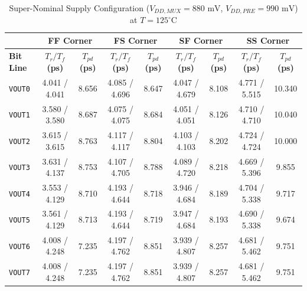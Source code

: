 \begin{table}[H]
    \centering
    \renewcommand{\arraystretch}{1.3}
    \setlength{\tabcolsep}{4pt}
    \small
    \begin{tabular}{|l|cc|cc|cc|cc|}
        \hline
        & \multicolumn{2}{c|}{\textbf{FF Corner}} & \multicolumn{2}{c|}{\textbf{FS Corner}} & \multicolumn{2}{c|}{\textbf{SF Corner}} & \multicolumn{2}{c|}{\textbf{SS Corner}} \\ \hline
        \textbf{Bit Line} & \textbf{$T_r / T_f$ (ps)} & \textbf{$T_{pd}$ (ps)} & \textbf{$T_r / T_f$ (ps)} & \textbf{$T_{pd}$ (ps)} & \textbf{$T_r / T_f$ (ps)} & \textbf{$T_{pd}$ (ps)} & \textbf{$T_r / T_f$ (ps)} & \textbf{$T_{pd}$ (ps)} \\ \hline
        \texttt{VOUT0} & 4.041 / 4.041 & 8.656 & 4.085 / 4.696 & 8.647 & 4.047 / 4.679 & 8.108 & 4.771 / 5.515 & 10.340 \\ 
        \texttt{VOUT1} & 3.580 / 3.580 & 8.687 & 4.075 / 4.075 & 8.684 & 4.051 / 4.051 & 8.126 & 4.710 / 4.710 & 10.040 \\ 
        \texttt{VOUT2} & 3.615 / 3.615 & 8.763 & 4.117 / 4.117 & 8.804 & 4.103 / 4.103 & 8.202 & 4.724 / 4.724 & 10.000 \\ 
        \texttt{VOUT3} & 3.631 / 4.137 & 8.753 & 4.107 / 4.705 & 8.788 & 4.089 / 4.720 & 8.218 & 4.669 / 5.396 & 9.855 \\ 
        \texttt{VOUT4} & 3.553 / 4.129 & 8.710 & 4.193 / 4.644 & 8.718 & 3.946 / 4.684 & 8.189 & 4.704 / 5.338 & 9.717 \\ 
        \texttt{VOUT5} & 3.561 / 4.129 & 8.713 & 4.193 / 4.644 & 8.719 & 3.947 / 4.684 & 8.193 & 4.690 / 5.338 & 9.674 \\ 
        \texttt{VOUT6} & 4.008 / 4.248 & 7.235 & 4.197 / 4.762 & 8.851 & 3.939 / 4.807 & 8.257 & 4.681 / 5.462 & 9.751 \\ 
        \texttt{VOUT7} & 4.008 / 4.248 & 7.235 & 4.197 / 4.762 & 8.851 & 3.939 / 4.807 & 8.257 & 4.681 / 5.462 & 9.751 \\ \hline
    \end{tabular}
    \vspace{2mm}
    \caption{Super-Nominal Supply Configuration ($V_{DD,MUX} = 880\text{ mV}$, $V_{DD,PRE} = 990\text{ mV}$) at $T = 125^{\circ}\text{C}$}
    \label{tab:supernominal_sym_125}
\end{table}

